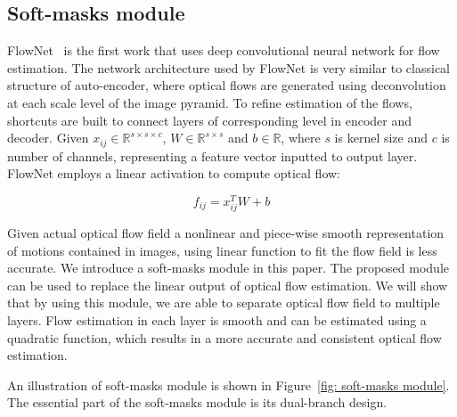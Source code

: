\documentclass[10pt,twocolumn,letterpaper]{article}
\begin{document}
\subsection{Soft-masks module}
FlowNet~\cite{7410673} is the first work that uses deep convolutional neural network for flow estimation. The network architecture used by FlowNet is very similar to classical structure of auto-encoder, where optical flows are generated using deconvolution at each scale level of the image pyramid. To refine estimation of the flows, shortcuts are built to connect layers of corresponding level in encoder and decoder. Given $x_{ij}\in \mathbb{R}^{s\times s \times c}$, $W\in \mathbb{R}^{s\times s}$ and $b\in\mathbb{R}$, where $s$ is kernel size and $c$ is number of channels, representing a feature vector inputted to output layer. FlowNet employs a linear activation to compute optical flow:

\begin{equation}
f_{ij} = x^T_{ij} W + b  
\end{equation}

Given actual optical flow field a nonlinear and piece-wise smooth representation of motions contained in images, using linear function to fit the flow field is less accurate. We introduce a soft-masks module in this paper. The proposed module can be used to replace the linear output of optical flow estimation. We will show that by using this module, we are able to separate optical flow field to multiple layers. Flow estimation in each layer is smooth and can be estimated using a quadratic function, which results in a more accurate and consistent optical flow estimation. 

An illustration of soft-masks module is shown in Figure~\ref{fig: soft-masks module}. The essential part of the soft-masks module is its dual-branch design. 
\end{document}
